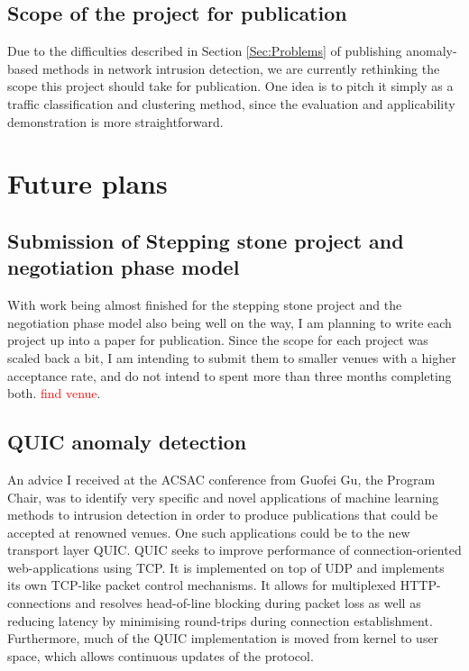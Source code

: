 \documentclass[a4paper,12pt,twoside]{article}
\begin{document}
\subsection{Scope of the project for publication}

Due to the difficulties described in Section \ref{Sec:Problems} of publishing anomaly-based methods in network intrusion detection, we are currently rethinking the scope this project should take for publication. One idea is to pitch it simply as a traffic classification and clustering method, since the evaluation and applicability demonstration is more straightforward.


\section{Future plans}

\subsection{Submission of Stepping stone project and negotiation phase model}

With work being almost finished for the stepping stone project and the negotiation phase model also being well on the way, I am planning to write each project up into a paper for publication. Since the scope for each project was scaled back a bit, I am intending to submit them to smaller venues with a higher acceptance rate, and do not intend to spent more than three months completing both. \textcolor{red}{find venue}.

\subsection{QUIC anomaly detection}

An advice I received at the ACSAC conference from Guofei Gu, the Program Chair, was to identify very specific and novel applications of machine learning methods to intrusion detection in order to produce publications that could be accepted at renowned venues. One such applications could be to the new transport layer QUIC. QUIC seeks to improve performance of connection-oriented web-applications using TCP. It is implemented on top of UDP and implements its own TCP-like packet control mechanisms. It allows for multiplexed HTTP-connections and resolves head-of-line blocking during packet loss as well as reducing latency by minimising round-trips during connection establishment. Furthermore, much of the QUIC implementation is moved from kernel to user space, which allows continuous updates of the protocol.
\end{document}
